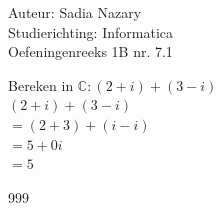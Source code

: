 \documentclass[a4paper]{article}
\begin{document}
  
\noindent \large Auteur: Sadia Nazary\\
\noindent \large Studierichting: Informatica\\
\noindent \large Oefeningenreeks 1B nr. 7.1\\

\medskip

\normalsize

Bereken in $\mathbb{C}: (2+i)+(3-i)$\\

$(2+i)+(3-i)$\\

$= (2+3) + (i - i)$\\

$= 5 + 0i$\\

$= 5$

\begin{thebibliography}{999}
\end{thebibliography}
\end{document}
